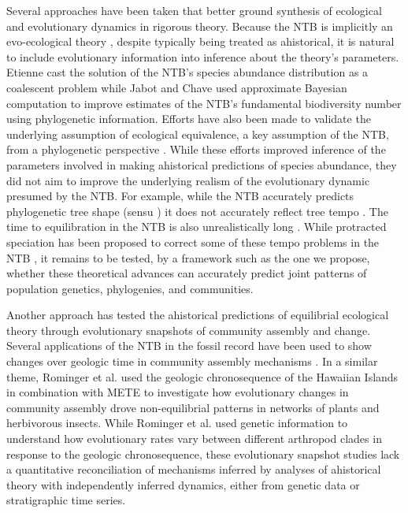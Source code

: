 \documentclass[12pt]{article}
\begin{document}
Several approaches have been taken that better ground synthesis of
ecological and evolutionary dynamics in rigorous theory. Because the
NTB is implicitly an evo-ecological theory \cite{Hubbell2001-dx,
  Hubbell2005-ng}, despite typically being treated as ahistorical, it
is natural to include evolutionary information into inference about
the theory's parameters. Etienne cast the solution of the NTB's
species abundance distribution as a coalescent problem
\cite{Etienne2004-fm} while Jabot and Chave \cite{Jabot2009-xr} used
approximate Bayesian computation to improve estimates of the NTB's
fundamental biodiversity number using phylogenetic
information. Efforts have also been made to validate the underlying
assumption of ecological equivalence, a key assumption of the NTB,
from a phylogenetic perspective \cite{Burbrink2015-vx}. While these
efforts improved inference of the parameters involved in making
ahistorical predictions of species abundance, they did not aim to
improve the underlying realism of the evolutionary dynamic presumed by
the NTB. For example, while the NTB accurately predicts phylogenetic
tree shape (sensu \cite{Jabot2009-xr}) it does not accurately reflect
tree tempo \cite{Davies2011-mz}. The time to equilibration in the NTB
is also unrealistically long \cite{Ricklefs2006-tn}. While protracted
speciation has been proposed to correct some of these tempo problems
in the NTB \cite{Rosindell2010-gq}, it remains to be tested, by a
framework such as the one we propose, whether these theoretical
advances can accurately predict joint patterns of population genetics,
phylogenies, and communities.

Another approach has tested the ahistorical predictions of equilibrial
ecological theory through evolutionary snapshots of community assembly
and change. Several applications of the NTB in the fossil record have
been used to show changes over geologic time in community assembly
mechanisms \cite{Olszewski2004-ud, Wagner2006-te}. In a similar theme,
Rominger et al. \cite{Rominger2015-kb} used the geologic
chronosequence of the Hawaiian Islands in combination with METE to
investigate how evolutionary changes in community assembly drove
non-equilibrial patterns in networks of plants and herbivorous
insects. While Rominger et al. used genetic information to understand
how evolutionary rates vary between different arthropod clades in
response to the geologic chronosequence, these evolutionary snapshot
studies lack a quantitative reconciliation of mechanisms inferred by
analyses of ahistorical theory with independently inferred dynamics,
either from genetic data or stratigraphic time series.
\end{document}
